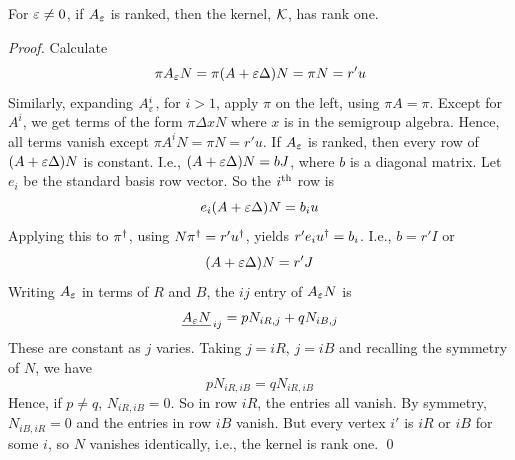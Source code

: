 \begin{theorem} 	\label{thm:6.3}
For $\varepsilon\ne0$, if $A_\varepsilon$ is ranked, then the kernel, ${\mathcal K}$, has rank one.
\end{theorem}

\begin{proof} 
Calculate 
$$
  \pi A_\varepsilon N=\pi(A+\varepsilon\Delta)N=\pi N=r'u
$$
Similarly, expanding $A_\varepsilon^i$, for $i>1$, apply $\pi$ on the left, using $\pi A=\pi$.
Except for $A^i$, we get terms of the form $\pi\Delta xN$ 
where $x$ is in the semigroup algebra. Hence, all terms vanish except
$\pi A^iN=\pi N=r'u$. If $A_\varepsilon$ is ranked, then every row of $(A+\varepsilon\Delta)N$ is constant.
I.e., $(A+\varepsilon\Delta)N=bJ$, where $b$ is a diagonal matrix. Let $e_i$ be the standard basis row vector.
So the $i^{\rm th}$ row is
$$ 
  e_i(A+\varepsilon\Delta)N=b_iu
$$
Applying this to $\dg \pi.$, using $N\dg\pi.=r'\dg u.$, yields $r'e_i\dg u.=b_i$. I.e., $b=r'I$ or
$$
  (A+\varepsilon\Delta)N=r'J
$$
Writing $A_\varepsilon$ in terms of $R$ and $B$, the $ij$ entry of $A_\varepsilon N$ is
$$
  \underline{A_\varepsilon N}_{\,ij}=pN_{iR,j}+qN_{iB,j}
$$
These are constant as $j$ varies. Taking $j=iR$, $j=iB$ and recalling the symmetry of $N$, we have
$$ 
  pN_{iR,iB}=qN_{iR,iB}
$$
Hence, if $p\ne q$,  $N_{iR,iB}=0$. So in row $iR$, the entries all vanish. By symmetry,
$N_{iB,iR}=0$ and the entries in row $iB$ vanish. But every vertex $i'$ is $iR$ or $iB$ for some $i$,
so $N$ vanishes identically, i.e., the kernel is rank one. \qed
\end{proof}
